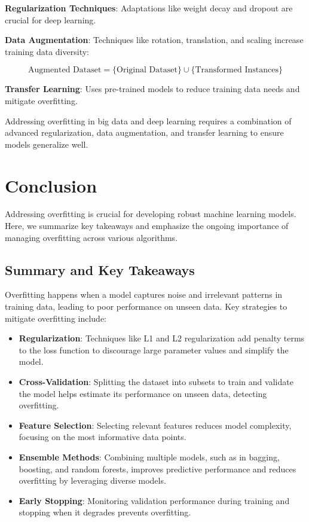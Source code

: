 \documentclass[12pt]{book} %
\begin{document}
\textbf{Regularization Techniques}: Adaptations like weight decay and dropout are crucial for deep learning.

\textbf{Data Augmentation}: Techniques like rotation, translation, and scaling increase training data diversity:

\[
\text{Augmented Dataset} = \{\text{Original Dataset}\} \cup \{\text{Transformed Instances}\}
\]

\textbf{Transfer Learning}: Uses pre-trained models to reduce training data needs and mitigate overfitting.

Addressing overfitting in big data and deep learning requires a combination of advanced regularization, data augmentation, and transfer learning to ensure models generalize well.

\section{Conclusion}

Addressing overfitting is crucial for developing robust machine learning models. Here, we summarize key takeaways and emphasize the ongoing importance of managing overfitting across various algorithms.

\subsection{Summary and Key Takeaways}

Overfitting happens when a model captures noise and irrelevant patterns in training data, leading to poor performance on unseen data. Key strategies to mitigate overfitting include:

\begin{itemize}
    \item \textbf{Regularization}: Techniques like L1 and L2 regularization add penalty terms to the loss function to discourage large parameter values and simplify the model.
    
    \item \textbf{Cross-Validation}: Splitting the dataset into subsets to train and validate the model helps estimate its performance on unseen data, detecting overfitting.

    \item \textbf{Feature Selection}: Selecting relevant features reduces model complexity, focusing on the most informative data points.

    \item \textbf{Ensemble Methods}: Combining multiple models, such as in bagging, boosting, and random forests, improves predictive performance and reduces overfitting by leveraging diverse models.

    \item \textbf{Early Stopping}: Monitoring validation performance during training and stopping when it degrades prevents overfitting.
\end{itemize}
\end{document}
